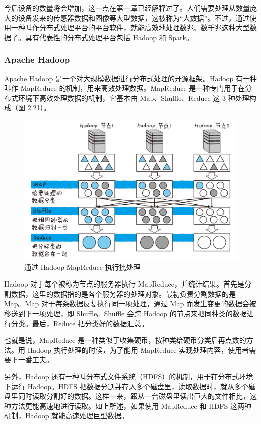 \documentclass[12pt,UTF8]{ctexbook}
\begin{document}
今后设备的数量将会增加，这一点在第一章已经解释过了。人们需要处理从数量庞大的设备发来的传感器数据和图像等大型数据，这被称为“大数据”。不过，通过使用一种叫作分布式处理平台的平台软件，就能高效地处理数兆、数千兆这种大型数据了。具有代表性的分布式处理平台包括 Hadoop 和 Spark。

\subsubsection{Apache Hadoop}

Apache Hadoop 是一个对大规模数据进行分布式处理的开源框架。Hadoop 有一种叫作 MapReduce 的机制，用来高效处理数据。MapReduce 是一种专门用于在分布式环境下高效处理数据的机制，它基本由 Map、Shuffle、Reduce 这 3 种处理构成（图 2.21）。

\begin{figure}[htbp]
	\centering
	\includegraphics[width=1\linewidth]{40}
	\caption{通过 Hadoop MapReduce 执行批处理}
	\label{fig:1}
\end{figure}

Hadoop 对于每个被称为节点的服务器执行 MapReduce，并统计结果。首先是分割数据，这里的数据指的是各个服务器的处理对象。最初负责分割数据的是 Map。Map 对于每条数据反复执行同一项处理，通过 Map 而发生变更的数据会被移送到下一项处理，即 Shuffle。Shuffle 会跨 Hadoop 的节点来把同种类的数据进行分类。最后，Reduce 把分类好的数据汇总。

也就是说，MapReduce 是一种类似于收集硬币，按种类给硬币分类后再点数的方法。用 Hadoop 执行处理的时候，为了能用 MapReduce 实现处理内容，使用者需要下一番工夫。

另外，Hadoop 还有一种叫分布式文件系统（HDFS）的机制，用于在分布式环境下运行 Hadoop。HDFS 把数据分割并存入多个磁盘里，读取数据时，就从多个磁盘里同时读取分割好的数据。这样一来，跟从一台磁盘里读出巨大的文件相比，这种方法更能高速地进行读取。如上所述，如果使用 MapReduce 和 HDFS 这两种机制，Hadoop 就能高速处理巨型数据。
\end{document}

